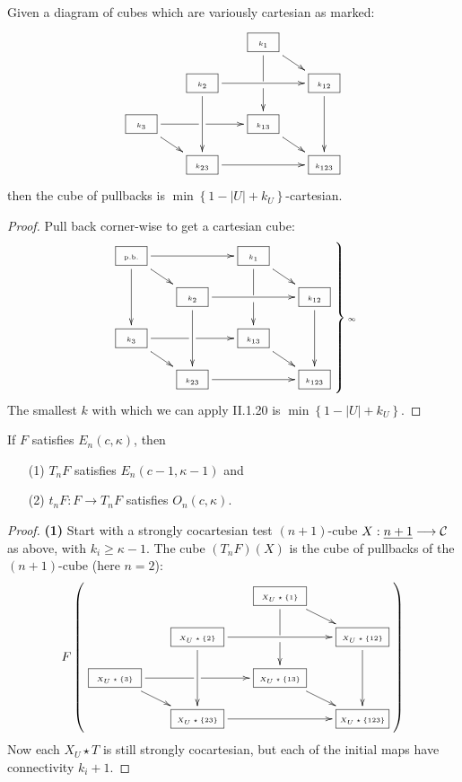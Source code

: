 \documentclass[11pt]{article}
\newcommand\ST{\rule[-.25em]{0pt}{1.25em}}
\begin{document}
\begin{Calculus II}
\begin{prop*}[II.1.22]
Given a diagram of cubes which are variously cartesian as marked:
\[ 
\vcenter{\xymatrix@R=.4cm@C=.6cm{
&&
\framebox[9mm][c]{\tiny$k_1$\ST}   \ar'[d][dd]\ar[rd]\\&
\framebox[9mm][c]{\tiny$k_2$\ST} \ar[dd]\ar[rr] &&
\framebox[9mm][c]{\tiny$k_{12}$\ST} \ar[dd] \\
\framebox[9mm][c]{\tiny$k_3$\ST}  \ar'[r][rr]\ar[rd] &&
\framebox[9mm][c]{\tiny$k_{13}$\ST}  \ar[rd] \\&
\framebox[9mm][c]{\tiny$k_{23}$\ST} \ar[rr] &&
\framebox[9mm][c]{\tiny$k_{123}$\ST}
}}\]
then the cube of pullbacks is $\min\left\{1-|U|+k_U\right\}$-cartesian.
\end{prop*}
\begin{proof}
Pull back corner-wise to get a cartesian cube: 
\[ 
\left.\vcenter{\xymatrix@R=.4cm@C=.6cm{
\framebox[9mm][c]{\tiny p.b.\ST} \ar[dd]\ar[rd]\ar[rr] &&
\framebox[9mm][c]{\tiny$k_1$\ST}   \ar'[d][dd]\ar[rd]\\&
\framebox[9mm][c]{\tiny$k_2$\ST} \ar[dd]\ar[rr] &&
\framebox[9mm][c]{\tiny$k_{12}$\ST} \ar[dd] \\
\framebox[9mm][c]{\tiny$k_3$\ST}  \ar'[r][rr]\ar[rd] &&
\framebox[9mm][c]{\tiny$k_{13}$\ST}  \ar[rd] \\&
\framebox[9mm][c]{\tiny$k_{23}$\ST} \ar[rr] &&
\framebox[9mm][c]{\tiny$k_{123}$\ST}
}}\right\}\textup{\tiny$\infty$}\]
The smallest $k$ with which we can apply II.1.20 is $\min\left\{1-|U|+k_U\right\}$.
\end{proof}






\begin{prop*}[III.1.4]
If $F$ satisfies $E_n(c,\kappa)$, then
\begin{enumerate}\squishlist
\setlength{\parindent}{.25in}
\item[\textup{(1)}] $T_nF$ satisfies
$E_n({c-1},\kappa -1)$ and
\item[\textup{(2)}] $t_nF:F\to T_nF$ satisfies
$O_n(c,\kappa)$.
\end{enumerate}
\end{prop*}
\begin{proof} \textbf{(1)}
Start with a strongly cocartesian test $(n+1)$-cube $X:\underline{n+1}\longrightarrow\mathcal{C}$ as above, with $k_i\geq\kappa-1$. The cube $(T_nF)(X)$ is the cube of pullbacks of the $(n+1)$-cube (here $n=2$):
\[ 
F\left(\vcenter{\xymatrix@R=.4cm@C=.6cm{
&&
\framebox[15mm][c]{\tiny$X_U\star\{1\}$\ST}   \ar'[d][dd]\ar[rd]\\&
\framebox[15mm][c]{\tiny$X_U\star\{2\}$\ST} \ar[dd]\ar[rr] &&
\framebox[15mm][c]{\tiny$X_U\star\{12\}$\ST} \ar[dd] \\
\framebox[15mm][c]{\tiny$X_U\star\{3\}$\ST}  \ar'[r][rr]\ar[rd] &&
\framebox[15mm][c]{\tiny$X_U\star\{13\}$\ST}  \ar[rd] \\&
\framebox[15mm][c]{\tiny$X_U\star\{23\}$\ST} \ar[rr] &&
\framebox[15mm][c]{\tiny$X_U\star\{123\}$\ST}
}}\right)\]
Now each $X_U\star T$ is still strongly cocartesian, but each of the initial maps have connectivity $k_i+1$.


\end{proof}
\end{Calculus II}
\end{document}

